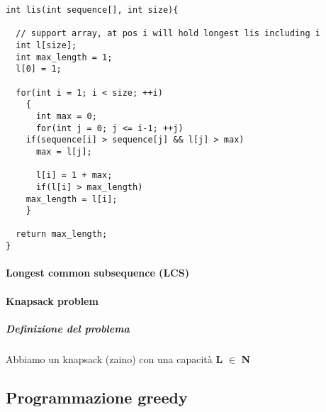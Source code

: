 \documentclass[11pt]{article}
\begin{document}
\begin{verbatim}
int lis(int sequence[], int size){

  // support array, at pos i will hold longest lis including i
  int l[size]; 
  int max_length = 1;
  l[0] = 1;

  for(int i = 1; i < size; ++i)
    {
      int max = 0;
      for(int j = 0; j <= i-1; ++j)
	if(sequence[i] > sequence[j] && l[j] > max)
	  max = l[j];

      l[i] = 1 + max;
      if(l[i] > max_length)
	max_length = l[i];
    }

  return max_length;
}
\end{verbatim}


\paragraph{Longest common subsequence (LCS)}
\label{sec:org1ff23b5}


\paragraph{Knapsack problem}
\label{sec:org5c06891}

\subparagraph{Definizione del problema}
\label{sec:org5974641}
Abbiamo un knapsack (zaino) con una capacità \textbf{L} \(\in\) \textbf{N} \\


\subsection{Programmazione greedy}
\label{sec:orge09fda3}
\end{document}
